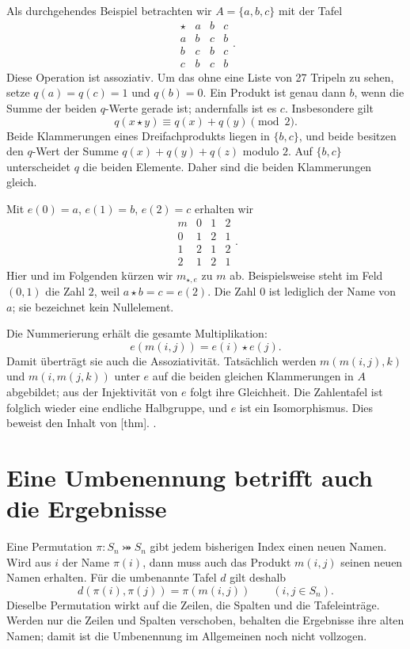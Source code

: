 Als durchgehendes Beispiel betrachten wir \(A=\{a,b,c\}\) mit der Tafel
\[
  \begin{array}{c|ccc}
    \star&a&b&c\\\hline
    a&b&c&b\\
    b&c&b&c\\
    c&b&c&b
  \end{array}.
\]
Diese Operation ist assoziativ. Um das ohne eine Liste von 27 Tripeln
zu sehen, setze \(q(a)=q(c)=1\) und \(q(b)=0\). Ein Produkt ist genau
dann \(b\), wenn die Summe der beiden \(q\)-Werte gerade ist;
andernfalls ist es \(c\). Insbesondere gilt
\[
  q(x\star y)\equiv q(x)+q(y)\pmod 2.
\]
Beide Klammerungen eines Dreifachprodukts liegen in \(\{b,c\}\), und
beide besitzen den \(q\)-Wert der Summe
\(q(x)+q(y)+q(z)\) modulo \(2\). Auf \(\{b,c\}\) unterscheidet
\(q\) die beiden Elemente. Daher sind die beiden Klammerungen gleich.

Mit \(e(0)=a\), \(e(1)=b\), \(e(2)=c\) erhalten wir
\[
  \begin{array}{c|ccc}
    m&0&1&2\\\hline
    0&1&2&1\\
    1&2&1&2\\
    2&1&2&1
  \end{array}.
\]
Hier und im Folgenden kürzen wir \(m_{\star,e}\) zu \(m\) ab.
Beispielsweise steht im Feld \((0,1)\) die Zahl \(2\), weil
\(a\star b=c=e(2)\). Die Zahl \(0\) ist lediglich der Name von
\(a\); sie bezeichnet kein Nullelement.

Die Nummerierung erhält die gesamte Multiplikation:
\[
  e(m(i,j))=e(i)\star e(j).
\]
Damit überträgt sie auch die Assoziativität. Tatsächlich werden
\(m(m(i,j),k)\) und \(m(i,m(j,k))\) unter \(e\) auf die beiden
gleichen Klammerungen in \(A\) abgebildet; aus der Injektivität von
\(e\) folgt ihre Gleichheit. Die Zahlentafel ist folglich wieder eine
endliche Halbgruppe, und \(e\) ist ein Isomorphismus. Dies beweist den
Inhalt von
[thm].
.

\section*{Eine Umbenennung betrifft auch die Ergebnisse}

Eine Permutation \(\pi\colon S_n\bij S_n\) gibt jedem bisherigen
Index einen neuen Namen. Wird aus \(i\) der Name \(\pi(i)\), dann
muss auch das Produkt \(m(i,j)\) seinen neuen Namen erhalten. Für die
umbenannte Tafel \(d\) gilt deshalb
\[
  d(\pi(i),\pi(j))=\pi(m(i,j))\qquad(i,j\in S_n).
  \tag{U}\label{table-isomorphisms-reading-relabel}
\]
Dieselbe Permutation wirkt auf die Zeilen, die Spalten und die
Tafeleinträge. Werden nur die Zeilen und Spalten verschoben, behalten
die Ergebnisse ihre alten Namen; damit ist die Umbenennung im
Allgemeinen noch nicht vollzogen.

